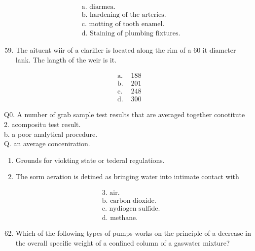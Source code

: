 \documentclass[10pt]{article}
\begin{document}
$$
\begin{aligned}
&\text { a. diarmea. } \\
&\text { b. hardening of the arteries. } \\
&\text { c. motting of tooth enamel. } \\
&\text { d. Staining of plumbing fixtures. }
\end{aligned}
$$

\begin{enumerate}
  \setcounter{enumi}{58}
  \item The aituent wiir of a clarifler is located along the rim of a 60 it diameter lank. The langth of the weir is it.
\end{enumerate}

$$
\begin{array}{ll}
\text { a. } & 188 \\
\text { b. } & 201 \\
\text { c. } & 248 \\
\text { d. } & 300
\end{array}
$$

Q0. A number of grab sample test results that are averaged together conotitute\\
2. acompositu test result.\\
b. a poor analytical procedure.\\
Q. an average conceniration.

\begin{enumerate}
  \item Grounds for viokting state or tederal regulations.

  \item The sorm aeration is detined as bringing water into intimate contact with

\end{enumerate}

$$
\begin{aligned}
&\text { 3. air. } \\
&\text { b. carbon dioxide. } \\
&\text { c. nydiogen sulfide. } \\
&\text { d. methane. }
\end{aligned}
$$

\begin{enumerate}
  \setcounter{enumi}{61}
  \item Which of the following types of pumps works on the principle of a decrease in the overall specific weight of a confined column of a gaswater mixture?
\end{enumerate}
\end{document}
